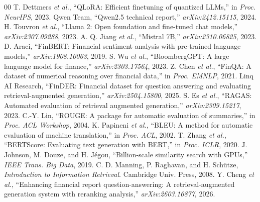 \documentclass[conference]{IEEEtran}
\begin{document}
\begin{thebibliography}{00}
 T. Dettmers \textit{et al.}, ``QLoRA: Efficient finetuning of quantized LLMs,'' in \textit{Proc. NeurIPS}, 2023.
 Qwen Team, ``Qwen2.5 technical report,'' \textit{arXiv:2412.15115}, 2024.
 H. Touvron \textit{et al.}, ``Llama 2: Open foundation and fine-tuned chat models,'' \textit{arXiv:2307.09288}, 2023.
 A. Q. Jiang \textit{et al.}, ``Mistral 7B,'' \textit{arXiv:2310.06825}, 2023.
 D. Araci, ``FinBERT: Financial sentiment analysis with pre-trained language models,'' \textit{arXiv:1908.10063}, 2019.
 S. Wu \textit{et al.}, ``BloombergGPT: A large language model for finance,'' \textit{arXiv:2303.17564}, 2023.
 Z. Chen \textit{et al.}, ``FinQA: A dataset of numerical reasoning over financial data,'' in \textit{Proc. EMNLP}, 2021.
 Linq AI Research, ``FinDER: Financial dataset for question answering and evaluating retrieval-augmented generation,'' \textit{arXiv:2504.15800}, 2025.
 S. Es \textit{et al.}, ``RAGAS: Automated evaluation of retrieval augmented generation,'' \textit{arXiv:2309.15217}, 2023.
 C.-Y. Lin, ``ROUGE: A package for automatic evaluation of summaries,'' in \textit{Proc. ACL Workshop}, 2004.
 K. Papineni \textit{et al.}, ``BLEU: A method for automatic evaluation of machine translation,'' in \textit{Proc. ACL}, 2002.
 T. Zhang \textit{et al.}, ``BERTScore: Evaluating text generation with BERT,'' in \textit{Proc. ICLR}, 2020.
 J. Johnson, M. Douze, and H. J\'egou, ``Billion-scale similarity search with GPUs,'' \textit{IEEE Trans. Big Data}, 2019.
 C. D. Manning, P. Raghavan, and H. Sch\"utze, \textit{Introduction to Information Retrieval}. Cambridge Univ. Press, 2008.
 Y. Cheng \textit{et al.}, ``Enhancing financial report question-answering: A retrieval-augmented generation system with reranking analysis,'' \textit{arXiv:2603.16877}, 2026.
\end{thebibliography}
\end{document}
